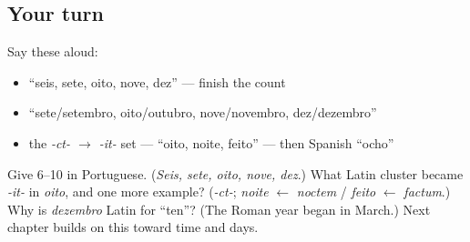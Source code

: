 \subsection*{Your turn}
Say these aloud:

\begin{itemize}
\raggedright
  \item \textquotedblleft{}seis, sete, oito, nove, dez\textquotedblright{} — finish the count
  \item \textquotedblleft{}sete/setembro, oito/outubro, nove/novembro, dez/dezembro\textquotedblright{}
  \item the \emph{-ct- $\to$ -it-} set — \textquotedblleft{}oito, noite, feito\textquotedblright{} — then Spanish \textquotedblleft{}ocho\textquotedblright{}
\end{itemize}

\begin{tcolorbox}[breakable,colback=teal!4,colframe=teal!35!black,title={Before you move on}]
Give 6–10 in Portuguese. (\emph{Seis, sete, oito, nove, dez}.) What Latin cluster became \emph{-it-} in \emph{oito}, and one more example? (\emph{-ct-}; \emph{noite} $\leftarrow$ \emph{noctem} / \emph{feito} $\leftarrow$ \emph{factum}.) Why is \emph{dezembro} Latin for \textquotedblleft{}ten\textquotedblright{}? (The Roman year began in March.) Next chapter builds on this toward time and days.
\end{tcolorbox}
